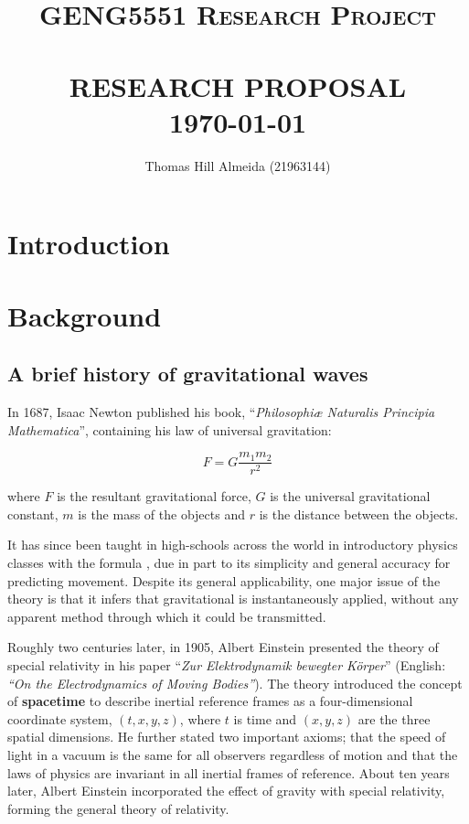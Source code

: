 \documentclass{article}
\title{\normalsize \textsc{GENG5551 Research Project}
        \\ [1.5cm]
        \HRule{0.5pt} \\
        \LARGE \textbf{\uppercase{Research Proposal}}
        \HRule{2pt} \\ [0.5cm]
        \normalsize \today \vspace*{3\baselineskip}}
\author{Thomas Hill Almeida (21963144)}
\date{}
\begin{document}
\maketitle{}
\tableofcontents{}
\newpage{}

\section*{Introduction}
\section{Background}

\subsection{A brief history of gravitational waves}

In 1687, Isaac Newton published his book, ``\textit{Philosophi\ae{} Naturalis Principia
Mathematica}'', containing his law of universal gravitation:

\begin{equation}
    F = G\dfrac{m_1m_2}{r^2}
\end{equation}

where \(F\) is the resultant gravitational force, \(G\) is the universal gravitational constant,
\(m\) is the mass of the objects and \(r\) is the distance between the objects.

It has since been taught in high-schools across the world in introductory physics classes with the
formula , due in part to its simplicity and general accuracy for predicting movement. Despite its
general applicability, one major issue of the theory is that it infers that gravitational is
instantaneously applied, without any apparent method through which it could be transmitted.

Roughly two centuries later, in 1905, Albert Einstein presented the theory of special relativity
in his paper ``\textit{Zur Elektrodynamik bewegter K{\"o}rper}'' (English: \textit{``On the
Electrodynamics of Moving Bodies''}). The theory introduced the concept of \textbf{spacetime} to
describe inertial reference frames as a four-dimensional coordinate system, \((t, x, y, z)\), where
$t$ is time and $(x, y, z)$ are the three spatial dimensions. He further stated two important
axioms; that the speed of light in a vacuum is the same for all observers regardless of motion and
that the laws of physics are invariant in all inertial frames of reference. About ten years later,
Albert Einstein incorporated the effect of gravity with special relativity, forming the general
theory of relativity.
\end{document}
